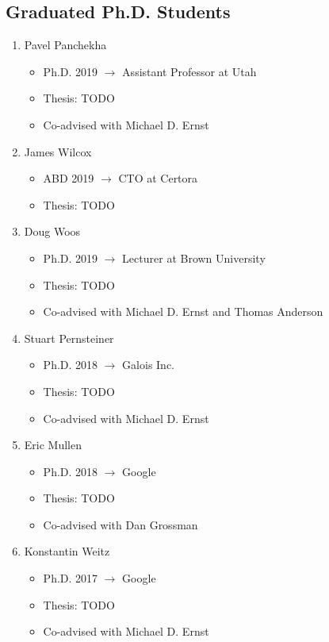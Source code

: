 \documentclass[10pt]{article}
\begin{document}

\subsection*{Graduated Ph.D. Students}

\begin{enumerate}[resume]
  \item Pavel Panchekha
    \begin{itemize}
      \item Ph.D. 2019 $\rightarrow$ Assistant Professor at Utah
      \item Thesis: TODO
      \item Co-advised with Michael D. Ernst
    \end{itemize}

  \item James Wilcox
    \begin{itemize}
      \item ABD 2019 $\rightarrow$ CTO at Certora
      \item Thesis: TODO
    \end{itemize}

  \item Doug Woos
    \begin{itemize}
      \item Ph.D. 2019 $\rightarrow$ Lecturer at Brown University
      \item Thesis: TODO
      \item Co-advised with Michael D. Ernst and Thomas Anderson
    \end{itemize}

  \item Stuart Pernsteiner
    \begin{itemize}
      \item Ph.D. 2018 $\rightarrow$ Galois Inc.
      \item Thesis: TODO
      \item Co-advised with Michael D. Ernst
    \end{itemize}

  \item Eric Mullen
    \begin{itemize}
      \item Ph.D. 2018 $\rightarrow$ Google
      \item Thesis: TODO
      \item Co-advised with Dan Grossman
    \end{itemize}

  \item Konstantin Weitz
    \begin{itemize}
      \item Ph.D. 2017 $\rightarrow$ Google
      \item Thesis: TODO
      \item Co-advised with Michael D. Ernst
    \end{itemize}
\end{enumerate}
\end{document}
